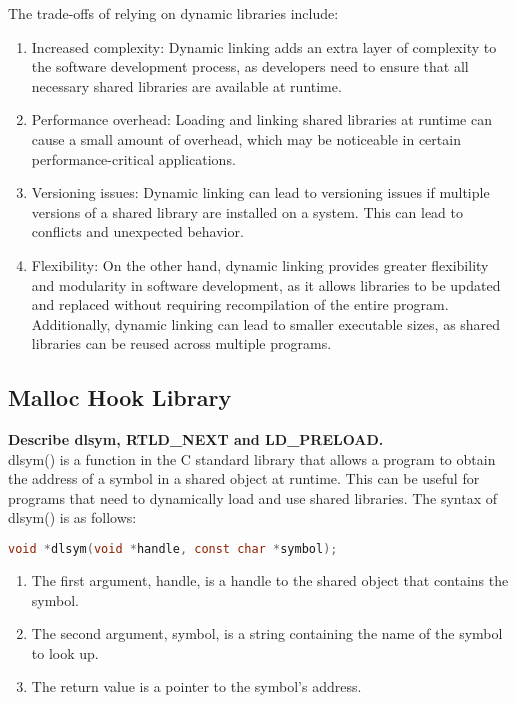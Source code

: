 \documentclass{article}
\begin{document}
The trade-offs of relying on dynamic libraries include:\\
\begin{enumerate}
    \item Increased complexity: Dynamic linking adds an extra layer of complexity to the software development process, as developers need to ensure that all necessary shared libraries are available at runtime.  \item Performance overhead: Loading and linking shared libraries at runtime can cause a small amount of overhead, which may be noticeable in certain performance-critical applications.
    \item Versioning issues: Dynamic linking can lead to versioning issues if multiple versions of a shared library are installed on a system. This can lead to conflicts and unexpected behavior.
    \item Flexibility: On the other hand, dynamic linking provides greater flexibility and modularity in software development, as it allows libraries to be updated and replaced without requiring recompilation of the entire program. Additionally, dynamic linking can lead to smaller executable sizes, as shared libraries can be reused across multiple programs.
\end{enumerate}

\subsection{Malloc Hook Library}

\textbf{Describe dlsym, RTLD\_NEXT and LD\_PRELOAD.}\\

dlsym() is a function in the C standard library that allows a program to obtain the address of a symbol in a shared object at runtime. This can be useful for programs that need to dynamically load and use shared libraries. The syntax of dlsym() is as follows:

\begin{lstlisting}[language=C, caption=dlsym prototype, basicstyle=\tiny]
    void *dlsym(void *handle, const char *symbol);
\end{lstlisting}

\begin{enumerate}
    \item The first argument, handle, is a handle to the shared object that contains the symbol. 
    \item The second argument, symbol, is a string containing the name of the symbol to look up. 
    \item The return value is a pointer to the symbol's address.
\end{enumerate}
\end{document}
